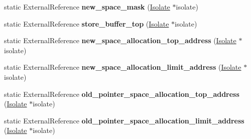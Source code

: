 \begin{DoxyCompactItemize}
\item 
\hypertarget{classv8_1_1internal_1_1_b_a_s_e___e_m_b_e_d_d_e_d_a2ff150af433baf90fcafd27d9d82ebe6}{}static External\+Reference {\bfseries new\+\_\+space\+\_\+mask} (\hyperlink{classv8_1_1internal_1_1_isolate}{Isolate} $\ast$isolate)\label{classv8_1_1internal_1_1_b_a_s_e___e_m_b_e_d_d_e_d_a2ff150af433baf90fcafd27d9d82ebe6}

\item 
\hypertarget{classv8_1_1internal_1_1_b_a_s_e___e_m_b_e_d_d_e_d_aa5bd6ce77ceafc59eea4a2803522c730}{}static External\+Reference {\bfseries store\+\_\+buffer\+\_\+top} (\hyperlink{classv8_1_1internal_1_1_isolate}{Isolate} $\ast$isolate)\label{classv8_1_1internal_1_1_b_a_s_e___e_m_b_e_d_d_e_d_aa5bd6ce77ceafc59eea4a2803522c730}

\item 
\hypertarget{classv8_1_1internal_1_1_b_a_s_e___e_m_b_e_d_d_e_d_acd4af758398a3228c4c437e5bdce9d8d}{}static External\+Reference {\bfseries new\+\_\+space\+\_\+allocation\+\_\+top\+\_\+address} (\hyperlink{classv8_1_1internal_1_1_isolate}{Isolate} $\ast$isolate)\label{classv8_1_1internal_1_1_b_a_s_e___e_m_b_e_d_d_e_d_acd4af758398a3228c4c437e5bdce9d8d}

\item 
\hypertarget{classv8_1_1internal_1_1_b_a_s_e___e_m_b_e_d_d_e_d_a57fcd041123aa105c86427d2b57a3255}{}static External\+Reference {\bfseries new\+\_\+space\+\_\+allocation\+\_\+limit\+\_\+address} (\hyperlink{classv8_1_1internal_1_1_isolate}{Isolate} $\ast$isolate)\label{classv8_1_1internal_1_1_b_a_s_e___e_m_b_e_d_d_e_d_a57fcd041123aa105c86427d2b57a3255}

\item 
\hypertarget{classv8_1_1internal_1_1_b_a_s_e___e_m_b_e_d_d_e_d_a631337b9ba523eb84e40b311478101a8}{}static External\+Reference {\bfseries old\+\_\+pointer\+\_\+space\+\_\+allocation\+\_\+top\+\_\+address} (\hyperlink{classv8_1_1internal_1_1_isolate}{Isolate} $\ast$isolate)\label{classv8_1_1internal_1_1_b_a_s_e___e_m_b_e_d_d_e_d_a631337b9ba523eb84e40b311478101a8}

\item 
\hypertarget{classv8_1_1internal_1_1_b_a_s_e___e_m_b_e_d_d_e_d_ab6a1a69a22d3cad581bec234d0826472}{}static External\+Reference {\bfseries old\+\_\+pointer\+\_\+space\+\_\+allocation\+\_\+limit\+\_\+address} (\hyperlink{classv8_1_1internal_1_1_isolate}{Isolate} $\ast$isolate)\label{classv8_1_1internal_1_1_b_a_s_e___e_m_b_e_d_d_e_d_ab6a1a69a22d3cad581bec234d0826472}


\end{DoxyCompactItemize}
